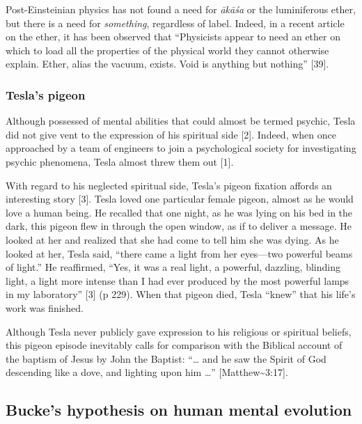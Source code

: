 \documentclass[
  11pt,
  a4paper,
]{article}
\begin{document}
Post-Einsteinian physics has not found a need for \emph{ākāśa} or the
luminiferous ether, but there is a need for \emph{something}, regardless
of label. Indeed, in a recent article on the ether, it has been observed
that ``Physicists appear to need an ether on which to load all the
properties of the physical world they cannot otherwise explain. Ether,
alias the vacuum, exists. Void is anything but nothing'' {[}39{]}.

\hypertarget{teslas-pigeon}{%
\subsubsection{Tesla's pigeon}\label{teslas-pigeon}}

Although possessed of mental abilities that could almost be termed
psychic, Tesla did not give vent to the expression of his spiritual side
{[}2{]}. Indeed, when once approached by a team of engineers to join a
psychological society for investigating psychic phenomena, Tesla almost
threw them out {[}1{]}.

With regard to his neglected spiritual side, Tesla's pigeon fixation
affords an interesting story {[}3{]}. Tesla loved one particular female
pigeon, almost as he would love a human being. He recalled that one
night, as he was lying on his bed in the dark, this pigeon flew in
through the open window, as if to deliver a message. He looked at her
and realized that she had come to tell him she was dying. As he looked
at her, Tesla said, ``there came a light from her eyes---two powerful
beams of light.'' He reaffirmed, ``Yes, it was a real light, a powerful,
dazzling, blinding light, a light more intense than I had ever produced
by the most powerful lamps in my laboratory'' {[}3{]} (p 229). When that
pigeon died, Tesla ``knew'' that his life's work was finished.

Although Tesla never publicly gave expression to his religious or
spiritual beliefs, this pigeon episode inevitably calls for comparison
with the Biblical account of the baptism of Jesus by John the Baptist:
``\ldots{} and he saw the Spirit of God descending like a dove, and
lighting upon him \ldots{}'' {[}Matthew\textasciitilde3:17{]}.

\hypertarget{buckes-hypothesis-on-human-mental-evolution}{%
\subsection{Bucke's hypothesis on human mental
evolution}\label{buckes-hypothesis-on-human-mental-evolution}}
\end{document}
